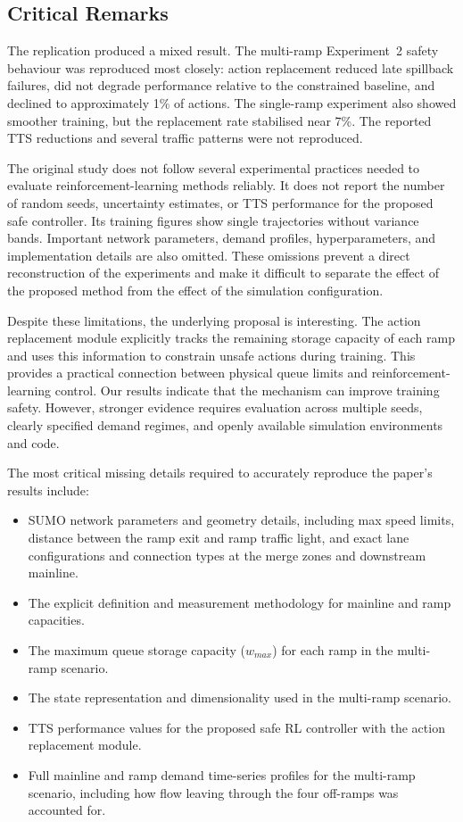\subsection{Critical Remarks}

The replication produced a mixed result. The multi-ramp Experiment~2 safety behaviour was reproduced most closely: action replacement reduced late spillback failures, did not degrade performance relative to the constrained baseline, and declined to approximately 1\% of actions. The single-ramp experiment also showed smoother training, but the replacement rate stabilised near 7\%. The reported TTS reductions and several traffic patterns were not reproduced.

The original study does not follow several experimental practices needed to evaluate reinforcement-learning methods reliably. It does not report the number of random seeds, uncertainty estimates, or TTS performance for the proposed safe controller. Its training figures show single trajectories without variance bands. Important network parameters, demand profiles, hyperparameters, and implementation details are also omitted. These omissions prevent a direct reconstruction of the experiments and make it difficult to separate the effect of the proposed method from the effect of the simulation configuration.

Despite these limitations, the underlying proposal is interesting. The action replacement module explicitly tracks the remaining storage capacity of each ramp and uses this information to constrain unsafe actions during training. This provides a practical connection between physical queue limits and reinforcement-learning control. Our results indicate that the mechanism can improve training safety. However, stronger evidence requires evaluation across multiple seeds, clearly specified demand regimes, and openly available simulation environments and code.

The most critical missing details required to accurately reproduce the paper's results include:

\begin{itemize}
    \item SUMO network parameters and geometry details, including max speed limits, distance between the ramp exit and ramp traffic light, and exact lane configurations and connection types at the merge zones and downstream mainline.
    \item The explicit definition and measurement methodology for mainline and ramp capacities.
    \item The maximum queue storage capacity ($w_{max}$) for each ramp in the multi-ramp scenario.
    \item The state representation and dimensionality used in the multi-ramp scenario.
    \item TTS performance values for the proposed safe RL controller with the action replacement module.
    \item Full mainline and ramp demand time-series profiles for the multi-ramp scenario, including how flow leaving through the four off-ramps was accounted for.
\end{itemize}


